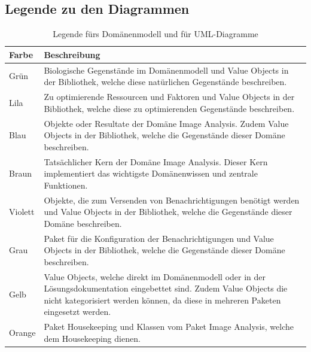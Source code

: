 \subsection{Legende zu den Diagrammen}
\begin{table}[H]
	\centering	
	
	\begin{tabular}{ p{2cm}  p{12cm}  }
		
		\toprule[1pt]
		\rowcolor{maroon!30}	
		Farbe & Beschreibung \\
		
		\midrule
Grün \cellcolor[RGB]{204,235,197}&  Biologische Gegenstände im Domänenmodell und Value Objects in der Bibliothek, welche diese natürlichen Gegenstände beschreiben. \\
Lila \cellcolor[RGB]{253,218,236} & Zu optimierende Ressourcen und Faktoren und Value Objects in der Bibliothek,  welche diese zu optimierenden Gegenstände beschreiben.\\
Blau\cellcolor[RGB]{179,205,227} &  Objekte oder Resultate der Domäne \flqq{}Image Analysis\frqq{}. Zudem Value Objects in der Bibliothek, welche die Gegenstände dieser Domäne beschreiben. \\
Braun \cellcolor[RGB]{229,216,189}& Tatsächlicher Kern der Domäne \flqq{}Image Analysis\frqq{}. Dieser Kern implementiert das wichtigste Domänenwissen und zentrale Funktionen.\\			
Violett \cellcolor[RGB]{222,203,228} & Objekte, die zum Versenden von Benachrichtigungen benötigt werden und Value Objects in der Bibliothek, welche die Gegenstände dieser Domäne beschreiben.\\
Grau\cellcolor[RGB]{242,242,242} &  Paket für die Konfiguration der Benachrichtigungen und Value Objects in der Bibliothek, welche die Gegenstände dieser Domäne beschreiben.\\		
Gelb \cellcolor[RGB]{255,255,204}& Value Objects, welche direkt im Domänenmodell oder in der Lösungsdokumentation eingebettet sind. Zudem Value Objects die nicht kategorisiert werden können, da diese in mehreren Paketen eingesetzt werden. \\		
Orange \cellcolor[RGB]{254,217,166} &  Paket Housekeeping und Klassen vom Paket \flqq{}Image Analysis\frqq{}, welche dem Housekeeping dienen. \\
		
		\bottomrule
		
	\end{tabular}
	\caption{Legende fürs Domänenmodell und für UML-Diagramme}
	\label{tab: Legende fürs Domänenmodell und für die UML-Diagramme als Lösungsdokumentation}
\end{table}

